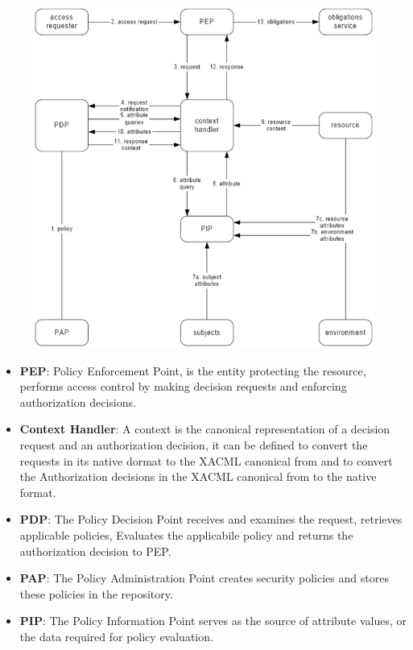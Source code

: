 \begin{figure}[h!]
    \centering
    \includegraphics[scale=0.35]{images/xacml_arch.png}
\end{figure}

\FloatBarrier

\begin{itemize}
    \item \textbf{PEP}: Policy Enforcement Point, is the entity protecting the resource, performs access control by making decision requests and enforcing authorization decisions.
    \item \textbf{Context Handler}: A context is the canonical representation of a decision request and an authorization decision, it can be defined to convert the requests in its native dormat to the XACML canonical from and to convert the Authorization decisions in the XACML canonical from to the native format.
    \item \textbf{PDP}: The Policy Decision Point receives and examines the request, retrieves applicable policies, Evaluates the applicabile policy and returns the authorization decision to PEP.
    \item \textbf{PAP}: The Policy Administration Point creates security policies and stores these policies in the repository.
    \item \textbf{PIP}: The Policy Information Point serves as the source of attribute values, or the data required for policy evaluation.
\end{itemize}

